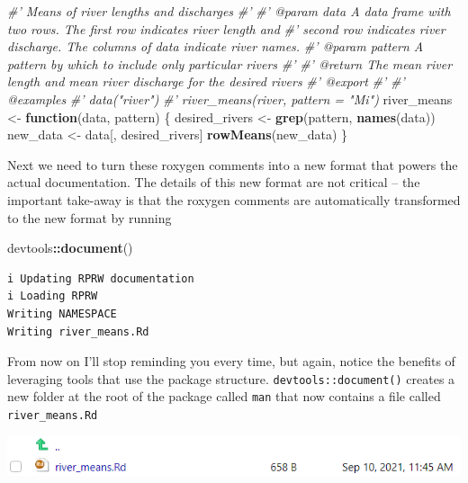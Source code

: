 \documentclass[
]{book}
\newenvironment{Shaded}{\begin{snugshade}}{\end{snugshade}}
\newcommand{\CommentTok}[1]{\textcolor[rgb]{0.56,0.35,0.01}{\textit{#1}}}
\newcommand{\ControlFlowTok}[1]{\textcolor[rgb]{0.13,0.29,0.53}{\textbf{#1}}}
\newcommand{\KeywordTok}[1]{\textcolor[rgb]{0.13,0.29,0.53}{\textbf{#1}}}
\newcommand{\NormalTok}[1]{#1}
\newcommand{\OperatorTok}[1]{\textcolor[rgb]{0.81,0.36,0.00}{\textbf{#1}}}
\newcommand{\StringTok}[1]{\textcolor[rgb]{0.31,0.60,0.02}{#1}}
\begin{document}
\begin{Shaded}
\begin{Highlighting}[]
\CommentTok{#' Means of river lengths and discharges}
\CommentTok{#'}
\CommentTok{#' @param data A data frame with two rows. The first row indicates river length and}
\CommentTok{#'   second row indicates river discharge. The columns of data indicate river names.}
\CommentTok{#' @param pattern A pattern by which to include only particular rivers}
\CommentTok{#'}
\CommentTok{#' @return The mean river length and mean river discharge for the desired rivers}
\CommentTok{#' @export}
\CommentTok{#'}
\CommentTok{#' @examples}
\CommentTok{#' data("river")}
\CommentTok{#' river_means(river, pattern = "Mi")}
\NormalTok{river_means <-}\StringTok{ }\ControlFlowTok{function}\NormalTok{(data, pattern) \{}
\NormalTok{  desired_rivers <-}\StringTok{ }\KeywordTok{grep}\NormalTok{(pattern, }\KeywordTok{names}\NormalTok{(data))}
\NormalTok{  new_data <-}\StringTok{ }\NormalTok{data[, desired_rivers]}
  \KeywordTok{rowMeans}\NormalTok{(new_data)}
\NormalTok{\}}
\end{Highlighting}
\end{Shaded}

Next we need to turn these roxygen comments into a new format that powers the actual documentation. The details of this new format are not critical -- the important take-away is that the roxygen comments are automatically transformed to the new format by running

\begin{Shaded}
\begin{Highlighting}[]
\NormalTok{devtools}\OperatorTok{::}\KeywordTok{document}\NormalTok{()}
\end{Highlighting}
\end{Shaded}

\begin{verbatim}
i Updating RPRW documentation
i Loading RPRW
Writing NAMESPACE
Writing river_means.Rd
\end{verbatim}

From now on I'll stop reminding you every time, but again, notice the benefits of leveraging tools that use the package structure. \texttt{devtools::document()} creates a new folder at the root of the package called \texttt{man} that now contains a file called \texttt{river\_means.Rd}

\includegraphics[width=1\linewidth]{images/newrpack_files2}
\end{document}
